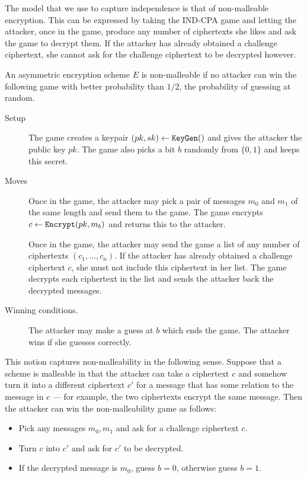 \documentclass[envcountsame]{llncs}
\newcommand{\alg}[1]{\textup{\texttt{#1}}}
\begin{document}
The model that we use to capture independence is that of non-malleable
encryption. This can be expressed by taking the IND-CPA game and letting the
attacker, once in the game, produce any number of ciphertexts she likes and ask
the game to decrypt them. If the attacker has already obtained a challenge
ciphertext, she cannot ask for the challenge ciphertext to be decrypted however.

\begin{definition}
An asymmetric encryption scheme $E$ is non-malleable if no attacker can win the
following game with better probability than $1/2$, the probability of guessing
at random.

\begin{description}
\item[Setup] The game creates a keypair $(pk, sk) \gets \alg{KeyGen}()$ and
gives the attacker the public key $pk$. The game also picks a bit $b$ randomly
from $\{0, 1\}$ and keeps this secret.
\item[Moves] Once in the game, the attacker may pick a pair of messages $m_0$
and $m_1$ of the same length and send them to the game. The game
encrypts $c \gets \alg{Encrypt} (pk, m_b)$ and returns this to the attacker.

Once in the game, the attacker may send the game a list of any number of
ciphertexts $(c_1, \ldots, c_n)$. If the attacker has already obtained a
challenge ciphertext $c$, she must not include this ciphertext in her list. The
game decrypts each ciphertext in the list and sends the attacker back the
decrypted messages.
\item[Winning conditions.] The attacker may make a guess at $b$ which ends the
game. The attacker wins if she guesses correctly.
\end{description}
\end{definition}

This notion captures non-malleability in the following sense. Suppose that a
scheme is malleable in that the attacker can take a ciphertext $c$ and somehow
turn it into a different ciphertext $c'$ for a message that has some relation
to the message in $c$ --- for example, the two ciphertexts encrypt the same
message. Then the attacker can win the non-malleability game as follows:

\begin{itemize}
\item Pick any messages $m_0, m_1$ and ask for a challenge ciphertext $c$.
\item Turn $c$ into $c'$ and ask for $c'$ to be decrypted.
\item If the decrypted message is $m_0$, guess $b = 0$, otherwise guess $b=1$.
\end{itemize}
\end{document}
